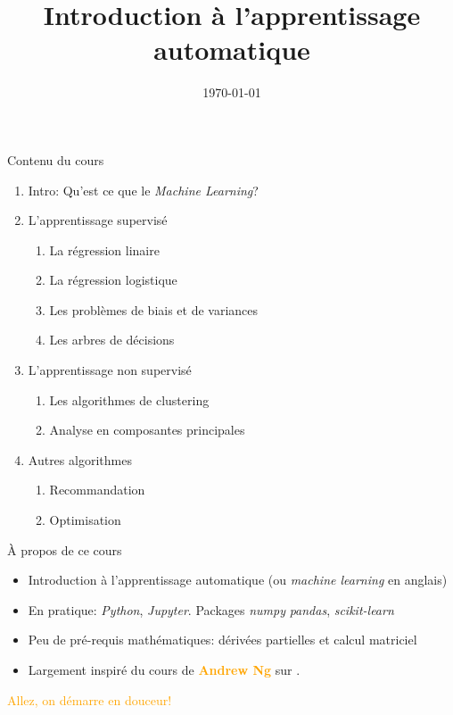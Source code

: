 \documentclass[aspectratio=169, unknownkeysallowed, 10pt]{beamer}
\title{Introduction à l'apprentissage automatique}
\date{\today}
\begin{document}
\agaetistitlepage

\begin{frame}{Contenu du cours}
  \begin{enumerate}
  \item Intro: Qu'est ce que le \textit{Machine Learning}?
  \item L'apprentissage supervisé
    \begin{enumerate}
    \item La régression linaire
    \item La régression logistique
    \item Les problèmes de biais et de variances
    \item Les arbres de décisions
    \end{enumerate}
  \item L'apprentissage non supervisé
    \begin{enumerate}
    \item Les algorithmes de clustering
    \item Analyse en composantes principales
    \end{enumerate}
  \item Autres algorithmes
    \begin{enumerate}
    \item Recommandation
    \item Optimisation
    \end{enumerate}
  \end{enumerate}
\end{frame}

\begin{frame}{À propos de ce cours}
  \begin{itemize}
  \item Introduction à l'apprentissage automatique (ou \textit{machine learning} en anglais)
  \item En pratique: \textit{Python}, \textit{Jupyter}. Packages \textit{numpy} \textit{pandas}, \textit{scikit-learn}
  \item Peu de pré-requis mathématiques: dérivées partielles et calcul matriciel
  \item Largement inspiré du cours de \textbf{\textcolor{orange}{Andrew Ng}} sur \href{https://www.coursera.org/learn/machine-learning}{\color{blue}{Coursera}}. 
  \end{itemize}
  
  \vfill
  \begin{center}
    \large
    \textcolor{orange}{Allez, on démarre en douceur!}
  \end{center}
\end{frame}





\end{document}
